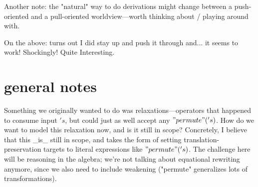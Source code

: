 \documentclass{article}
\begin{document}
Another note: the "natural" way to do derivations might change between a push-oriented and a pull-oriented worldview---worth thinking about / playing around with.

On the above: turns out I did stay up and push it through and... it seems to work! Shockingly! Quite Interesting. 

\section{general notes}

Something we originally wanted to do was relaxations---operators that happened to consume input $'s$, but could just as well accept any $"permute"('s)$.  How do we want to model this relaxation now, and is it still in scope? Concretely, I believe that this _is_ still in scope, and takes the form of setting translation-preservation targets to literal expressions like $"permute"('s)$.  The challenge here will be reasoning in the algebra; we're not talking about equational rewriting anymore, since we also need to include weakening ("permute" generalizes lots of transformations). 
\end{document}
